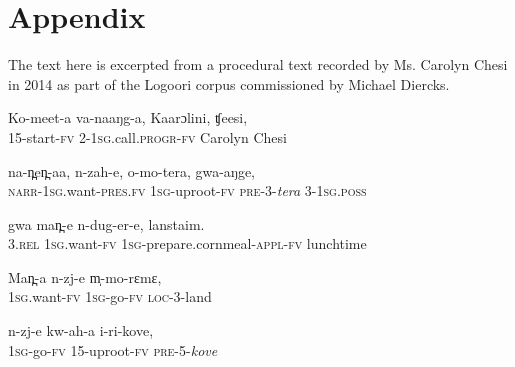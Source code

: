 \documentclass[output=paper]{LSP/langsci}
\begin{document}
\section*{Appendix}
\setcounter{equation}{0}
The text here is excerpted from a procedural text recorded by Ms. Carolyn Chesi in 2014 as part of the Logoori corpus commissioned by Michael Diercks.


 \begin{exe}
\ex \label{Saapp1}
\gll Ko-meet-a va-naaŋg-a, Kaarɔlini, ʧeesi,\\     	       
15-start-\textsc{fv}  2-\textsc{1sg}.call.\textsc{progr}-\textsc{fv}  Carolyn  Chesi \\
\glt {} 
\end{exe}

 \begin{exe}
\ex \label{Saapp2}
\gll na-n̪en̪-aa, n-zah-e, o-mo-tera, gwa-aŋge,\\
\textsc{narr}-\textsc{1sg}.want-\textsc{pres}.\textsc{fv}  \textsc{1sg}-uproot-\textsc{fv}  \textsc{pre}-3-\textit{tera}  3-\textsc{1sg}.\textsc{poss}\\
\glt {}
\end{exe}

 \begin{exe}
\ex \label{Saapp3}
\gll gwa man̪-e n-dug-er-e, lanstaim.\\
3.\textsc{rel}  \textsc{1sg}.want-\textsc{fv}  \textsc{1sg}-prepare.cornmeal-\textsc{appl}-\textsc{fv}  lunchtime\\
\glt {}
\end{exe}

 \begin{exe}
\ex \label{Saapp4}
\gll Man̪-a n-zj-e m̩-mo-rɛmɛ,\\
\textsc{1sg}.want-\textsc{fv}   \textsc{1sg}-go-\textsc{fv}   \textsc{loc}-3-land\\
\glt {}
\end{exe}

 \begin{exe}
\ex \label{Saapp5}
\gll n-zj-e kw-ah-a i-ri-kove,\\
\textsc{1sg}-go-\textsc{fv}   15-uproot-\textsc{fv}   \textsc{pre}-5-\textit{kove}\\
\glt {}
\end{exe}
\end{document}
